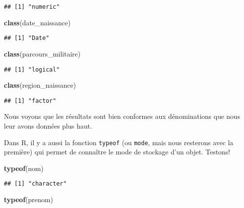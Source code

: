 \documentclass[]{book}
\newenvironment{Shaded}{\begin{snugshade}}{\end{snugshade}}
\newcommand{\KeywordTok}[1]{\textcolor[rgb]{0.13,0.29,0.53}{\textbf{#1}}}
\newcommand{\NormalTok}[1]{#1}
\begin{document}
\begin{verbatim}
## [1] "numeric"
\end{verbatim}

\begin{Shaded}
\begin{Highlighting}[]
\KeywordTok{class}\NormalTok{(date_naissance)}
\end{Highlighting}
\end{Shaded}

\begin{verbatim}
## [1] "Date"
\end{verbatim}

\begin{Shaded}
\begin{Highlighting}[]
\KeywordTok{class}\NormalTok{(parcours_militaire)}
\end{Highlighting}
\end{Shaded}

\begin{verbatim}
## [1] "logical"
\end{verbatim}

\begin{Shaded}
\begin{Highlighting}[]
\KeywordTok{class}\NormalTok{(region_naissance)}
\end{Highlighting}
\end{Shaded}

\begin{verbatim}
## [1] "factor"
\end{verbatim}

Nous voyons que les résultats sont bien conformes aux dénominations que
nous leur avons données plus haut.

Dans R, il y a aussi la fonction \texttt{typeof} (ou \texttt{mode}, mais
nous resterons avec la première) qui permet de connaître le mode de
stockage d'un objet. Testons!

\begin{Shaded}
\begin{Highlighting}[]
\KeywordTok{typeof}\NormalTok{(nom)}
\end{Highlighting}
\end{Shaded}

\begin{verbatim}
## [1] "character"
\end{verbatim}

\begin{Shaded}
\begin{Highlighting}[]
\KeywordTok{typeof}\NormalTok{(prenom)}
\end{Highlighting}
\end{Shaded}
\end{document}
